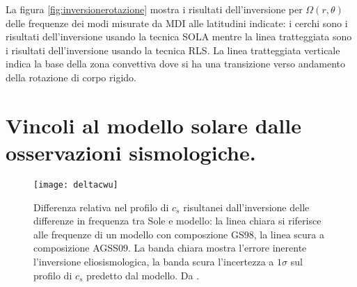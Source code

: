 \documentclass[../main.tex]{subfiles}
\begin{document}
La figura \ref{fig:inversionerotazione} mostra i risultati dell'inversione per $\Omega(r,\theta)$ delle frequenze dei modi misurate da MDI alle latitudini indicate: i cerchi sono i risultati dell'inversione usando la tecnica SOLA mentre la linea tratteggiata sono i risultati dell'inversione usando la tecnica RLS. La linea tratteggiata verticale indica la base della zona convettiva dove si ha una transizione verso andamento della rotazione di corpo rigido.

{\let\clearpage\relax\let\cleardoublepage\relax
\chapter{Vincoli al modello solare dalle osservazioni sismologiche.}%
}


\begin{figure}[!ht]%
        \texttt{[image: deltacwu]}
        \caption{Differenza relativa nel profilo di $c_s$ risultanei dall'inversione delle differenze in frequenza tra Sole e modello: la linea chiara si riferisce alle frequenze di un modello con composzione GS98, la linea scura a composizione AGSS09. La banda chiara mostra l'errore inerente l'inversione eliosismologica, la banda scura l'incertezza a $1\sigma$ sul profilo di $c_s$ predetto dal modello. Da \cite{villante2014chemical}.}\label{fig:deltacwu}
\end{figure}
\end{document}
